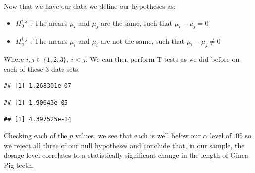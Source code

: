 \documentclass[]{article}
\newenvironment{Shaded}{\begin{snugshade}}{\end{snugshade}}
\newcommand{\KeywordTok}[1]{\textcolor[rgb]{0.13,0.29,0.53}{\textbf{{#1}}}}
\newcommand{\DataTypeTok}[1]{\textcolor[rgb]{0.13,0.29,0.53}{{#1}}}
\newcommand{\StringTok}[1]{\textcolor[rgb]{0.31,0.60,0.02}{{#1}}}
\newcommand{\NormalTok}[1]{{#1}}
\begin{document}
Now that we have our data we define our hypotheses as:

\begin{itemize}
\item $H_0^{i,j}$ : The means $\mu_{i}$ and $\mu_{j}$ are the same, such that $\mu_{i} - \mu_{j} = 0$
\item $H_a^{i,j}$ : The means $\mu_{i}$ and $\mu_{i}$ are not the same, such that $\mu_{i} - \mu_{j} \neq 0$
\end{itemize}

Where \(i,j \in \{1,2,3\}, \ i < j\). We can then perform T tests as we
did before on each of these 3 data sets:

\begin{Shaded}
\end{Shaded}

\begin{verbatim}
## [1] 1.268301e-07
\end{verbatim}

\begin{Shaded}
\end{Shaded}

\begin{verbatim}
## [1] 1.90643e-05
\end{verbatim}

\begin{Shaded}
\end{Shaded}

\begin{verbatim}
## [1] 4.397525e-14
\end{verbatim}

Checking each of the \(p\) values, we see that each is well below our
\(\alpha\) level of .05 so we reject all three of our null hypotheses
and conclude that, in our sample, the dosage level correlates to a
statistically significant change in the length of Ginea Pig teeth.
\end{document}
